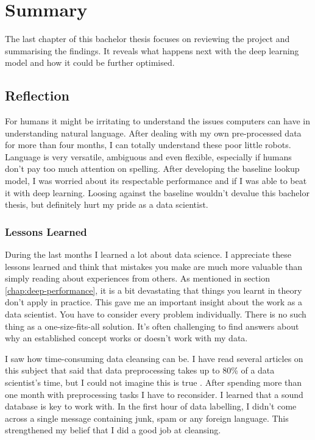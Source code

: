 \chapter{Summary}

The last chapter of this bachelor thesis focuses on reviewing the project and summarising the findings. It reveals what happens next with the deep learning model and how it could be further optimised.

\section{Reflection}

For humans it might be irritating to understand the issues computers can have in understanding natural language. After dealing with my own pre-processed data for more than four months, I can totally understand these poor little robots. Language is very versatile, ambiguous and even flexible, especially if humans don't pay too much attention on spelling.
After developing the baseline lookup model, I was worried about its respectable performance and if I was able to beat it with deep learning. Loosing against the baseline wouldn't devalue this bachelor thesis, but definitely hurt my pride as a data scientist.

\subsection{Lessons Learned}

During the last months I learned a lot about data science. I appreciate these lessons learned and think that mistakes you make are much more valuable than simply reading about experiences from others. As mentioned in section \ref{chap:deep-performance}, it is a bit devastating that things you learnt in theory don't apply in practice. This gave me an important insight about the work as a data scientist. You have to consider every problem individually. There is no such thing as a one-size-fits-all solution. It's often challenging to find answers about why an established concept works or doesn't work with my data.

I saw how time-consuming data cleansing can be. I have read several articles on this subject that said that data preprocessing takes up to 80\% of a data scientist's time, but I could not imagine this is true \cite{naman18}. After spending more than one month with preprocessing tasks I have to reconsider. I learned that a sound database is key to work with. In the first hour of data labelling, I didn't come across a single message containing junk, spam or any foreign language. This strengthened my belief that I did a good job at cleansing.

